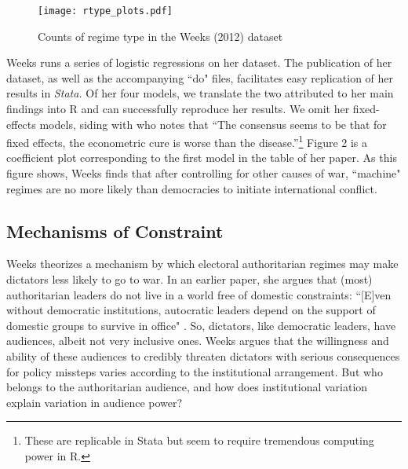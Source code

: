 \documentclass[12pt]{article}
\begin{document}
\begin{figure}
\texttt{[image: rtype\_plots.pdf]}
	\caption{Counts of regime type in the Weeks (2012) dataset}
\end{figure}

\par Weeks runs a series of logistic regressions on her dataset. The publication of her dataset, as well as the accompanying ``do" files, facilitates easy replication of her results in \textit{Stata.} Of her four models, we translate the two attributed to her main findings into R and can successfully reproduce her results. We omit her fixed-effects models, siding with \textcite[249]{dafoe:2011} who notes that ``The consensus seems to be that for fixed effects, the econometric cure is worse than the disease.''\footnote{These are replicable in Stata but seem to require tremendous computing power in R.} Figure 2 is a coefficient plot corresponding to the first model in the table of her paper. As this figure shows, Weeks finds that after controlling for other causes of war, ``machine" regimes are no more likely than democracies to initiate international conflict.

\subsection{Mechanisms of Constraint}

\par Weeks theorizes a mechanism by which electoral authoritarian regimes may make dictators less likely to go to war. In an earlier paper, she argues that (most) authoritarian leaders do not live in a world free of domestic constraints: ``[E]ven without democratic institutions, autocratic leaders depend on the support of domestic groups to survive in office" \parencite*[38]{weeks:2008}. So, dictators, like democratic leaders, have audiences, albeit not very inclusive ones. Weeks argues that the willingness and ability of these audiences to credibly threaten dictators with serious consequences for policy missteps varies according to the institutional arrangement. But who belongs to the authoritarian audience, and how does institutional variation explain variation in audience power?
\end{document}
